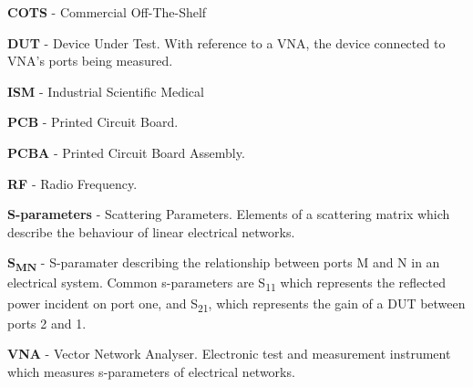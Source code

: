 \textbf{COTS} - Commercial Off-The-Shelf

\textbf{DUT} - Device Under Test. With reference to a VNA, the device connected to VNA's ports being measured. 

\textbf{ISM} - Industrial Scientific Medical

\textbf{PCB} - Printed Circuit Board. 

\textbf{PCBA} - Printed Circuit Board Assembly.

\textbf{RF} - Radio Frequency.

\textbf{S-parameters} - Scattering Parameters. Elements of a scattering matrix which describe the behaviour of linear electrical networks. 

\textbf{S\textsubscript{MN}} - S-paramater describing the relationship between ports M and N in an electrical system. Common s-parameters are S\textsubscript{11} which represents the reflected power incident on port one, and S\textsubscript{21}, which represents the gain of a DUT between ports 2 and 1.  

\textbf{VNA} - Vector Network Analyser. Electronic test and measurement instrument which measures s-parameters of electrical networks. 
